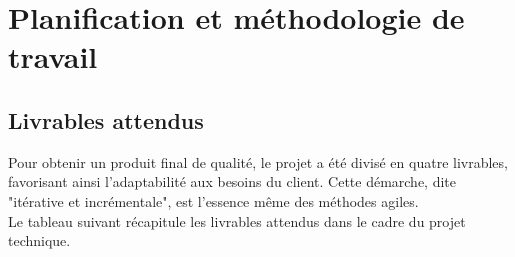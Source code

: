 \documentclass[a4paper, 12pt]{report}
\begin{document}
        
\chapter{\textbf{Planification et méthodologie de travail}}
\section{Livrables attendus}
Pour obtenir un produit final de qualité, le projet a été divisé en quatre livrables, favorisant ainsi l'adaptabilité aux besoins du client. Cette démarche, dite "itérative et incrémentale", est l'essence même des méthodes agiles. \\

Le tableau suivant récapitule les livrables attendus dans le cadre du projet technique.
\end{document}
